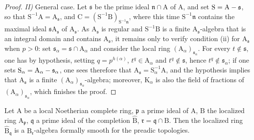 \begin{proof}
\emph{II)} General case.
Let $\mathfrak{s}$ be the prime ideal $\mathfrak{n}\cap\mathrm{A}$ of $\mathrm{A}$, and set $\mathrm{S}=\mathrm{A}-\mathfrak{s}$, so that $\mathrm{S}^{-1}\mathrm{A}=\mathrm{A}_\mathfrak{s}$, and $\mathrm{C}=(\mathrm{S}^{-1}\mathrm{B})_{\mathrm{S}^{-1}\mathfrak{n}}$, where this time $\mathrm{S}^{-1}\mathfrak{n}$ contains the maximal ideal $\mathfrak{s}\mathrm{A}_\mathfrak{s}$ of $\mathrm{A}_\mathfrak{s}$.
As $\mathrm{A}_\mathfrak{s}$ is regular  and $\mathrm{S}^{-1}\mathrm{B}$ is a finite $\mathrm{A}_\mathfrak{s}$-algebra that is an integral domain and contains $\mathrm{A}_\mathfrak{s}$, it remains only to verify condition (ii) for $\mathrm{A}_\mathfrak{s}$ when $p>0$: set $\mathfrak{s}_\alpha=\mathfrak{s}\cap\mathrm{A}_\alpha$ and consider the local ring $(\mathrm{A}_\alpha)_{\mathfrak{s}_\alpha}$.
For every $t\notin\mathfrak{s}$, one has by hypothesis, setting $q=p^{h(\alpha)}$, $t^q\in\mathrm{A}_\alpha$ and $t^q\notin\mathfrak{s}$, hence $t^q\notin\mathfrak{s}_\alpha$; if one sets $\mathrm{S}_\alpha=\mathrm{A}_\alpha-\mathfrak{s}_\alpha$, one sees therefore that $\mathrm{A}_\mathfrak{s}=\mathrm{S}_\alpha^{-1}\mathrm{A}$, and the hypothesis implies that $\mathrm{A}_\mathfrak{s}$ is a finite $(\mathrm{A}_\alpha)_{\mathfrak{s}_\alpha}$-algebra; moreover, $\mathrm{K}_\alpha$ is also the field of fractions of $(\mathrm{A}_\alpha)_{\mathfrak{s}_\alpha}$, which finishes the proof.
\end{proof}

\begin{theorem}[22.3.3]
\label{0.22.3.3}
Let $\mathrm{A}$ be a local Noetherian \textup{complete} ring, $\mathfrak{p}$ a prime ideal of $\mathrm{A}$, $\mathrm{B}$ the localized ring $\mathrm{A}_\mathfrak{p}$, $\mathfrak{q}$ a prime ideal of the completion $\widehat{\mathrm{B}}$, $\mathfrak{r}=\mathfrak{q}\cap\mathrm{B}$.
Then the localized ring $\widehat{\mathrm{B}}_\mathfrak{q}$ is a $\mathrm{B}_\mathfrak{r}$-algebra formally smooth for the preadic topologies.
\end{theorem}

